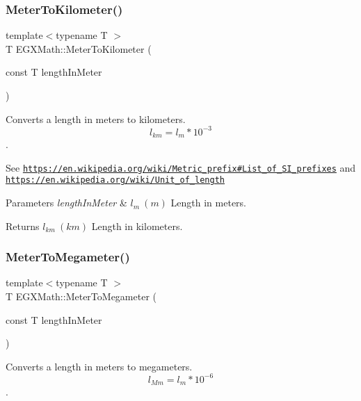 \subsubsection{\texorpdfstring{Meter\+To\+Kilometer()}{MeterToKilometer()}}
{\footnotesize\ttfamily template$<$typename T $>$ \\
T E\+G\+X\+Math\+::\+Meter\+To\+Kilometer (\begin{DoxyParamCaption}\item[{const T}]{length\+In\+Meter }\end{DoxyParamCaption})}



Converts a length in meters to kilometers. \[ l_{km}=l_{m} * 10^{-3} \]. 

See \href{https://en.wikipedia.org/wiki/Metric_prefix#List_of_SI_prefixes}{\tt https\+://en.\+wikipedia.\+org/wiki/\+Metric\+\_\+prefix\#\+List\+\_\+of\+\_\+\+S\+I\+\_\+prefixes} and \href{https://en.wikipedia.org/wiki/Unit_of_length}{\tt https\+://en.\+wikipedia.\+org/wiki/\+Unit\+\_\+of\+\_\+length} 
\begin{DoxyParams}{Parameters}
{\em length\+In\+Meter} & $ l_{m}\ (m)$ Length in meters. \\
\hline
\end{DoxyParams}
\begin{DoxyReturn}{Returns}
$ l_{km}\ (km)$ Length in kilometers. 
\end{DoxyReturn}
\mbox{\label{group___e_g_x_math-_conversions-_length_conversions-_s_i-_meter-_s_i_ga738fd2590049b1c2ae6ef2ecad9ed7f9}} 
\subsubsection{\texorpdfstring{Meter\+To\+Megameter()}{MeterToMegameter()}}
{\footnotesize\ttfamily template$<$typename T $>$ \\
T E\+G\+X\+Math\+::\+Meter\+To\+Megameter (\begin{DoxyParamCaption}\item[{const T}]{length\+In\+Meter }\end{DoxyParamCaption})}



Converts a length in meters to megameters. \[ l_{Mm}=l_{m} * 10^{-6} \]. 

